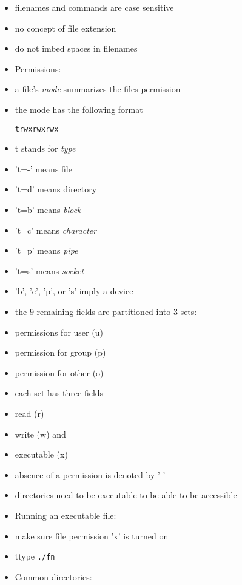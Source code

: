 \documentclass[twocolumn]{IEEEtran} %
\begin{document}
\begin{itemize}
	   \item filenames and commands are case sensitive
	   \item no concept of file extension
	   \item do not imbed spaces in filenames
    \ei
    \item Permissions:
    \bi
        \item a file's \emph{mode} summarizes the files permission
        \item the mode has the following format
\begin{verbatim}
trwxrwxrwx
\end{verbatim}
        \item t stands for \emph{type}
        \bi
            \item 't=-' means file
            \item 't=d' means directory
            \item 't=b' means \emph{block}
            \item 't=c' means \emph{character}
            \item 't=p' means \emph{pipe}
            \item 't=s' means \emph{socket}
            \item 'b', 'c', 'p', or 's' imply a device
        \ei
        \item the $9$ remaining fields are partitioned into $3$ sets:
        \bi
            \item permissions for user (u)
            \item permission for group (p)
            \item permission for other (o)
        \ei
        \item each set has three fields
        \bi
            \item read (r)
            \item write (w) and
            \item executable (x)
        \ei
        \item absence of a permission is denoted by '-'
        \item directories need to be executable to be able to be accessible
    \ei
    \item Running an executable file:
    \bi
        \item make sure file permission 'x' is turned on
        \item ttype \verb|./fn|
    \ei
    \item Common directories:
    \bi

\end{itemize}
\end{document}
